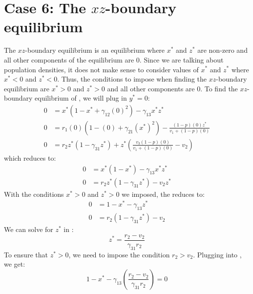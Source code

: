 \section{Case 6: The $xz$-boundary equilibrium}\label{sec:xz_boundary_equilibrium}
The $xz$-boundary equilibrium is an equilibrium where $x^*$ and $z^*$ are non-zero and all other components of the equilibrium are 0. Since we are talking about population densities, it does not make sense to consider values of $x^*$ and $z^*$ where $x^*<0$ and $z^*<0$. Thus, the conditions to impose when finding the $xz$-boundary equilibrium are $x^*>0$ and $z^*>0$ and all other components are 0. To find the $xz$-boundary equilibrium of , we will plug in $y^*=0$:
\begin{align*}
    0 &= x^*\left(1-x^*+\gamma_{12}(0)^2\right)-\gamma_{13}x^*z^*\\
    0 &= r_1(0)\left(1-(0)+\gamma_{21}\left(x^*\right)^2\right)-\frac{\left(1-p\right)(0)z^*}{v_1+\left(1-p\right)(0)}\\
    0 &= r_2z^*\left(1-\gamma_{31}z^*\right)+z^*\left(\frac{v_3\left(1-p\right)(0)}{v_1+\left(1-p\right)(0)}-v_2\right)
\end{align*}
which reduces to:
\begin{subequations}
    \begin{align}
        0 &= x^*\left(1-x^*\right)-\gamma_{13}x^*z^*
        \label{eq:4.9a}\\
        0 &= r_2z^*\left(1-\gamma_{31}z^*\right)-v_2z^*
        \label{eq:4.9b}
    \end{align}
    \label{eq:4.9}
\end{subequations}
With the conditions $x^*>0$ and $z^*>0$ we imposed, the  reduces to:
\begin{subequations}
    \begin{align}
        0 &= 1-x^*-\gamma_{13}z^*
        \label{eq:4.10a}\\
        0 &= r_2\left(1-\gamma_{31}z^*\right)-v_2
        \label{eq:4.10b}
    \end{align}
    \label{eq:4.10}
\end{subequations}
We can solve for $z^*$ in :
\begin{equation}
    z^*=\frac{r_2-v_2}{\gamma_{31}r_2}
    \label{eq:4.11}
\end{equation}
To ensure that $z^*>0$, we need to impose the condition $r_2>v_2$. Plugging  into , we get:
\begin{equation}
    1-x^*-\gamma_{13}\left(\frac{r_2-v_2}{\gamma_{31}r_2}\right)=0
    \label{eq:4.12}
\end{equation}
